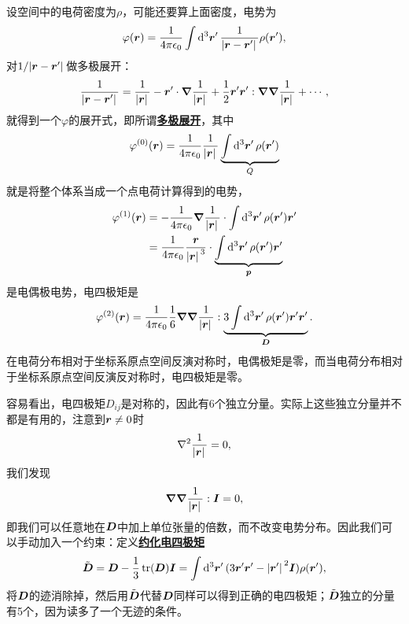 \documentclass[UTF8, a4paper]{ctexart}
\newcommand*{\concept}[1]{\underline{\textbf{#1}}}
\begin{document}
设空间中的电荷密度为$\rho$，可能还要算上面密度，电势为
\[
    \varphi(\vb*{r}) = \frac{1}{4\pi \epsilon_0} \int \dd[3]{\vb*{r}'} \frac{1}{\abs*{\vb*{r} - \vb*{r}'}} \rho(\vb*{r}'),
\]
对$1/\abs*{\vb*{r}-\vb*{r}'}$做多极展开：
\[
    \frac{1}{\abs*{\vb*{r}-\vb*{r}'}} = \frac{1}{\abs*{\vb*{r}}} - \vb*{r}' \cdot \grad{\frac{1}{\abs*{\vb*{r}}}} + \frac{1}{2} \vb*{r}' \vb*{r}' : \grad{\grad{\frac{1}{\abs*{\vb*{r}}}}} + \cdots,
\]
就得到一个$\varphi$的展开式，即所谓\concept{多极展开}，其中
\begin{equation}
    \varphi^{(0)}(\vb*{r}) = \frac{1}{4\pi \epsilon_0} \frac{1}{\abs*{\vb*{r}}} \underbrace{\int \dd[3]{\vb*{r}'} \rho(\vb*{r}')}_{Q}
\end{equation}
就是将整个体系当成一个点电荷计算得到的电势，
\begin{equation}
    \begin{aligned}
        \varphi^{(1)}(\vb*{r}) &= - \frac{1}{4\pi \epsilon_0} \grad{\frac{1}{\abs*{\vb*{r}}}} \cdot \int \dd[3]{\vb*{r}'} \rho(\vb*{r}') \vb*{r}' \\
        &= \frac{1}{4\pi \epsilon_0} \frac{\vb*{r}}{\abs*{\vb*{r}}^3} \cdot \underbrace{\int \dd[3]{\vb*{r}'} \rho(\vb*{r}') \vb*{r}'}_{\vb*{p}}
    \end{aligned}
\end{equation}
是电偶极电势，电四极矩是
\begin{equation}
    \varphi^{(2)}(\vb*{r}) = \frac{1}{4 \pi \epsilon_0} \frac{1}{6} \grad{\grad{\frac{1}{\abs*{\vb*{r}}}}} : \underbrace{3 \int \dd[3]{\vb*{r}'} \rho(\vb*{r}') \vb*{r}' \vb*{r}' }_{\vb*{D}}.
\end{equation}
在电荷分布相对于坐标系原点空间反演对称时，电偶极矩是零，而当电荷分布相对于坐标系原点空间反演反对称时，电四极矩是零。

容易看出，电四极矩$D_{ij}$是对称的，因此有6个独立分量。实际上这些独立分量并不都是有用的，注意到$\vb*{r} \neq 0$时
\[
    \laplacian{\frac{1}{\abs*{\vb*{r}}}} = 0,
\]
我们发现
\[
    \grad{\grad{\frac{1}{\abs*{\vb*{r}}}}} : \vb*{I} = 0,
\]
即我们可以任意地在$\vb*{D}$中加上单位张量的倍数，而不改变电势分布。因此我们可以手动加入一个约束：定义\concept{约化电四极矩}
\begin{equation}
    \tilde{\vb*{D}} = \vb*{D} - \frac{1}{3} \trace(\vb*{D}) \vb*{I} = \int \dd[3]{\vb*{r}'} (3 \vb*{r}' \vb*{r}' - \abs*{\vb*{r}'}^2 \vb*{I}) \rho(\vb*{r}') ,
\end{equation}
将$\vb*{D}$的迹消除掉，然后用$\tilde{\vb*{D}}$代替$\vb*{D}$同样可以得到正确的电四极矩；$\tilde{\vb*{D}}$独立的分量有5个，因为读多了一个无迹的条件。
\end{document}
